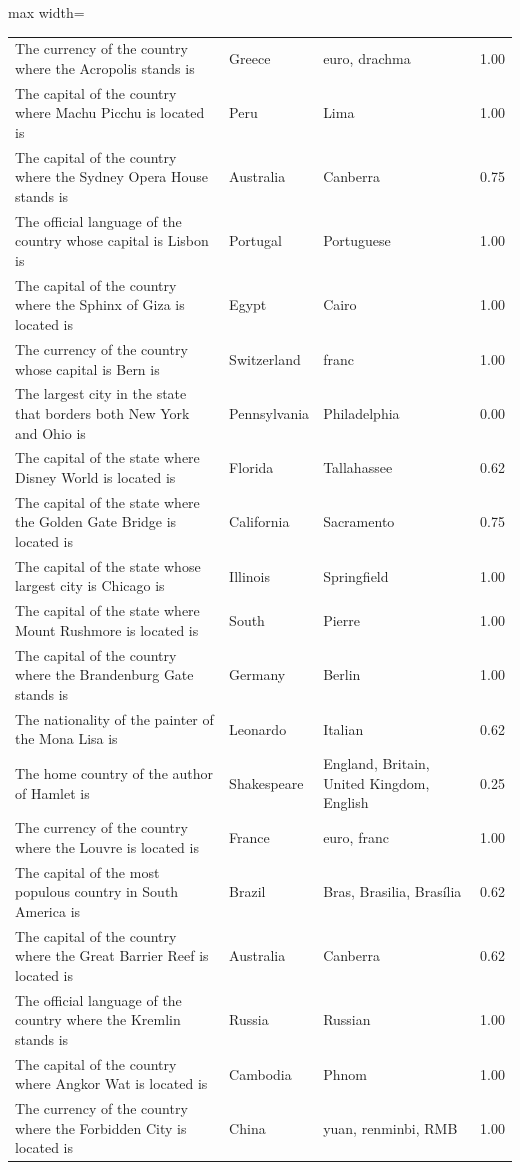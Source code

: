 \begin{table}[t]
\begin{adjustbox}{max width=\textwidth}
\begin{tabular}{p{7.5cm}llr}
The currency of the country where the Acropolis stands is & Greece & euro, drachma & 1.00 \\
The capital of the country where Machu Picchu is located is & Peru & Lima & 1.00 \\
The capital of the country where the Sydney Opera House stands is & Australia & Canberra & 0.75 \\
The official language of the country whose capital is Lisbon is & Portugal & Portuguese & 1.00 \\
The capital of the country where the Sphinx of Giza is located is & Egypt & Cairo & 1.00 \\
The currency of the country whose capital is Bern is & Switzerland & franc & 1.00 \\
The largest city in the state that borders both New York and Ohio is & Pennsylvania & Philadelphia & 0.00 \\
The capital of the state where Disney World is located is & Florida & Tallahassee & 0.62 \\
The capital of the state where the Golden Gate Bridge is located is & California & Sacramento & 0.75 \\
The capital of the state whose largest city is Chicago is & Illinois & Springfield & 1.00 \\
The capital of the state where Mount Rushmore is located is & South & Pierre & 1.00 \\
The capital of the country where the Brandenburg Gate stands is & Germany & Berlin & 1.00 \\
The nationality of the painter of the Mona Lisa is & Leonardo & Italian & 0.62 \\
The home country of the author of Hamlet is & Shakespeare & England, Britain, United Kingdom, English & 0.25 \\
The currency of the country where the Louvre is located is & France & euro, franc & 1.00 \\
The capital of the most populous country in South America is & Brazil & Bras, Brasilia, Brasília & 0.62 \\
The capital of the country where the Great Barrier Reef is located is & Australia & Canberra & 0.62 \\
The official language of the country where the Kremlin stands is & Russia & Russian & 1.00 \\
The capital of the country where Angkor Wat is located is & Cambodia & Phnom & 1.00 \\
The currency of the country where the Forbidden City is located is & China & yuan, renminbi, RMB & 1.00 \\

\end{tabular}
\end{adjustbox}
\end{table}
